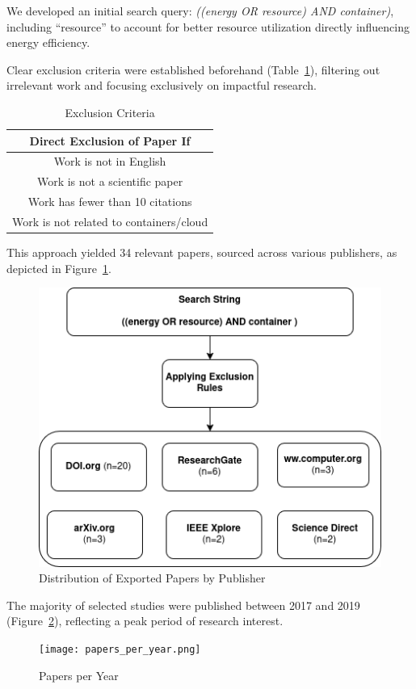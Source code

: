 \documentclass[runningheads]{llncs}
\begin{document}
We developed an initial search query: \textit{((energy OR resource) AND container)}, including ``resource'' to account for better resource utilization directly influencing energy efficiency.

Clear exclusion criteria were established beforehand (Table~\ref{tab:Exclusion Rules}), filtering out irrelevant work and focusing exclusively on impactful research.
\begin{table}[H]
\centering
\begin{tabular}{c}
\hline
Direct Exclusion of Paper If \\ \hline
Work is not in English \\ 
Work is not a scientific paper \\ 
Work has fewer than 10 citations \\ 
Work is not related to containers/cloud \\ \hline
\end{tabular}
    \caption{Exclusion Criteria}
    \label{tab:Exclusion Rules}
\end{table}

This approach yielded 34 relevant papers, sourced across various publishers, as depicted in Figure~\ref{fig:exported_papers}.

\begin{figure}[H]
    \centering
    \includegraphics[width=0.7\columnwidth]{exportedPapers.png}
    \caption{Distribution of Exported Papers by Publisher}\label{fig:exported_papers}
\end{figure}

The majority of selected studies were published between 2017 and 2019 (Figure~\ref{fig:papers_per_year}), reflecting a peak period of research interest.

\begin{figure}[H]
    \centering
    \texttt{[image: papers\_per\_year.png]}
    \caption{Papers per Year}\label{fig:papers_per_year}
\end{figure}
\end{document}

